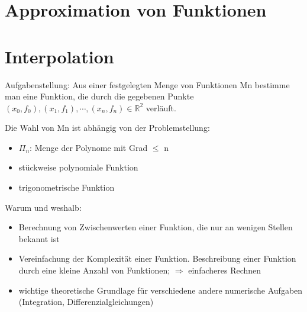 \section{Approximation von Funktionen}
\section{Interpolation}
Aufgabenstellung: Aus einer festgelegten Menge von Funktionen Mn 
bestimme man eine Funktion, die durch die gegebenen Punkte
$(x_0, f_0), (x_1, f_1), \cdots, (x_n, f_n) \in \mathbb{R}^2$ verläuft.

Die Wahl von Mn ist abhängig von der Problemstellung:
\begin{itemize}
  \item $\Pi_n$: Menge der Polynome mit Grad $\leq$ n
  \item stückweise polynomiale Funktion
  \item trigonometrische Funktion
\end{itemize}
Warum und weshalb:
\begin{itemize}
  \item Berechnung von Zwischenwerten einer Funktion, die nur an wenigen 
    Stellen bekannt ist
  \item Vereinfachung der Komplexität einer Funktion. Beschreibung
    einer Funktion durch eine kleine Anzahl von Funktionen; $\Rightarrow$
    einfacheres Rechnen
  \item wichtige theoretische Grundlage für verschiedene andere numerische
    Aufgaben (Integration, Differenzialgleichungen)
\end{itemize}
